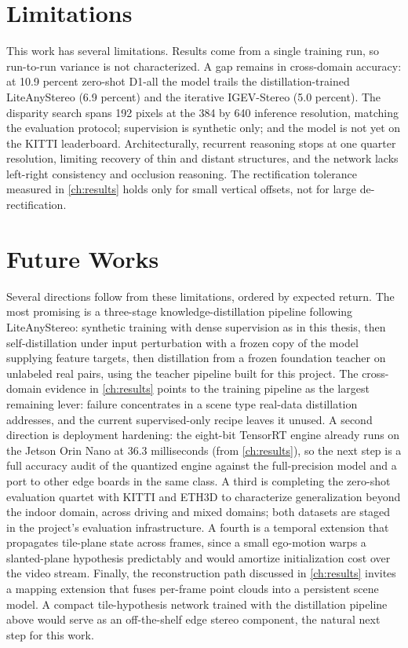 \FloatBarrier
\section{Limitations}
This work has several limitations. Results come from a single training
run, so run-to-run variance is not characterized. A gap remains in
cross-domain accuracy: at 10.9 percent zero-shot D1-all the model trails
the distillation-trained LiteAnyStereo (6.9 percent) and the iterative
IGEV-Stereo (5.0 percent). The disparity search spans 192 pixels at the 384 by
640 inference resolution, matching the evaluation protocol; supervision
is synthetic only; and the model is not yet on the KITTI leaderboard. Architecturally, recurrent reasoning
stops at one quarter resolution, limiting recovery of thin and distant
structures, and the network lacks left-right consistency and occlusion
reasoning. The rectification tolerance measured in \ref{ch:results} holds only
for small vertical offsets, not for large de-rectification.

\FloatBarrier
\section{Future Works}
Several directions follow from these limitations, ordered by expected
return. The most promising is a three-stage knowledge-distillation
pipeline following LiteAnyStereo: synthetic training with dense
supervision as in this thesis, then self-distillation under input
perturbation with a frozen copy of the model supplying feature targets,
then distillation from a frozen foundation teacher on unlabeled real
pairs, using the teacher pipeline built for this project. The
cross-domain evidence in \ref{ch:results} points to the training
pipeline as the largest remaining lever: failure concentrates in a scene type real-data
distillation addresses, and the current supervised-only recipe leaves
it unused. A second direction is deployment hardening: the eight-bit
TensorRT engine already runs on the Jetson Orin Nano at 36.3 milliseconds
(from \ref{ch:results}), so the next step is a full accuracy audit of the quantized
engine against the full-precision model and a port to other edge boards
in the same class. A third is completing the zero-shot evaluation quartet with
KITTI and ETH3D to characterize generalization beyond the indoor domain,
across driving and mixed domains; both datasets are staged in the
project's evaluation infrastructure. A fourth is a temporal
extension that propagates tile-plane state across frames, since a
small ego-motion warps a slanted-plane hypothesis predictably and would
amortize initialization cost over the video stream. Finally, the
reconstruction path discussed in \ref{ch:results} invites a mapping extension that fuses
per-frame point clouds into a persistent scene model. A compact
tile-hypothesis network trained with the distillation pipeline above
would serve as an off-the-shelf edge stereo component, the natural next
step for this work.


